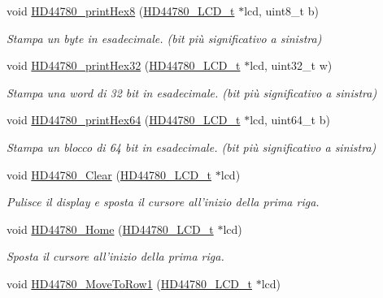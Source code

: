 \begin{DoxyCompactItemize}
void \hyperlink{group___h_d44780_gad967bd458b4d2bd358a93cbb7144addd}{H\+D44780\+\_\+print\+Hex8} (\hyperlink{struct_h_d44780___l_c_d__t}{H\+D44780\+\_\+\+L\+C\+D\+\_\+t} $\ast$lcd, uint8\+\_\+t b)
\begin{DoxyCompactList}\small\item\em Stampa un byte in esadecimale. (bit più significativo a sinistra) \end{DoxyCompactList}\item 
void \hyperlink{group___h_d44780_gaa82a2a27a3008f55c969a2d390c50497}{H\+D44780\+\_\+print\+Hex32} (\hyperlink{struct_h_d44780___l_c_d__t}{H\+D44780\+\_\+\+L\+C\+D\+\_\+t} $\ast$lcd, uint32\+\_\+t w)
\begin{DoxyCompactList}\small\item\em Stampa una word di 32 bit in esadecimale. (bit più significativo a sinistra) \end{DoxyCompactList}\item 
void \hyperlink{group___h_d44780_ga7a4b110e7da806f8c01e01d184d3a19a}{H\+D44780\+\_\+print\+Hex64} (\hyperlink{struct_h_d44780___l_c_d__t}{H\+D44780\+\_\+\+L\+C\+D\+\_\+t} $\ast$lcd, uint64\+\_\+t b)
\begin{DoxyCompactList}\small\item\em Stampa un blocco di 64 bit in esadecimale. (bit più significativo a sinistra) \end{DoxyCompactList}\item 
void \hyperlink{group___h_d44780_ga38cac13d7a66f068be54f79a716ff7d4}{H\+D44780\+\_\+\+Clear} (\hyperlink{struct_h_d44780___l_c_d__t}{H\+D44780\+\_\+\+L\+C\+D\+\_\+t} $\ast$lcd)
\begin{DoxyCompactList}\small\item\em Pulisce il display e sposta il cursore all'inizio della prima riga. \end{DoxyCompactList}\item 
void \hyperlink{group___h_d44780_ga68e3712332aa9482d4bdaa4991a92127}{H\+D44780\+\_\+\+Home} (\hyperlink{struct_h_d44780___l_c_d__t}{H\+D44780\+\_\+\+L\+C\+D\+\_\+t} $\ast$lcd)
\begin{DoxyCompactList}\small\item\em Sposta il cursore all'inizio della prima riga. \end{DoxyCompactList}\item 
void \hyperlink{group___h_d44780_gad90e2924a4e632ce42940323f8f49e37}{H\+D44780\+\_\+\+Move\+To\+Row1} (\hyperlink{struct_h_d44780___l_c_d__t}{H\+D44780\+\_\+\+L\+C\+D\+\_\+t} $\ast$lcd)

\end{DoxyCompactItemize}
